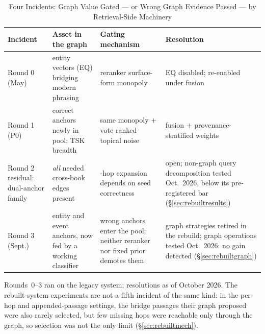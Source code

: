 \begin{table}[!t]
\caption{Four Incidents: Graph Value Gated --- or Wrong Graph Evidence
Passed --- by Retrieval-Side Machinery}
\label{tab:threerounds}
\centering
\begin{threeparttable}
\footnotesize
\begin{tabular}{@{}>{\raggedright\arraybackslash}p{1.35cm}%
>{\raggedright\arraybackslash}p{2.5cm}%
>{\raggedright\arraybackslash}p{2.1cm}%
>{\raggedright\arraybackslash}p{1.55cm}@{}}
\toprule
Incident & Asset in the graph & Gating mechanism & Resolution \\
\midrule
Round 0 (May) & entity vectors (EQ) bridging modern phrasing & reranker
surface-form monopoly & EQ disabled; re-enabled under fusion \\
Round 1 (P0) & correct anchors newly in pool; TSK breadth & same monopoly
$+$ vote-ranked topical noise & fusion $+$ provenance-stratified
weights \\
Round 2 residual: dual-anchor family & \emph{all} needed cross-book
edges present & 1-hop expansion depends on seed correctness & open;
non-graph query decomposition tested Oct.\ 2026, below its
pre-registered bar (\S\ref{sec:rebuiltresults}) \\
Round 3 (Sept.) & entity and event anchors, now fed by a working
classifier & wrong anchors enter the pool; neither reranker nor fixed
prior demotes them & graph strategies retired in the rebuild; graph
operations tested Oct.\ 2026: no gain detected
(\S\ref{sec:rebuiltgraph}) \\
\bottomrule
\end{tabular}
\begin{tablenotes}\footnotesize
\item Rounds~0--3 ran on the legacy system; resolutions as of October
2026. The rebuilt-system experiments are not a fifth incident of the
same kind: in the per-hop and appended-passage settings, the bridge passages their graph proposed were also rarely selected, but few missing hops were reachable only through the graph, so selection
was not the only limit (\S\ref{sec:rebuiltmech}).
\end{tablenotes}
\end{threeparttable}
\end{table}

